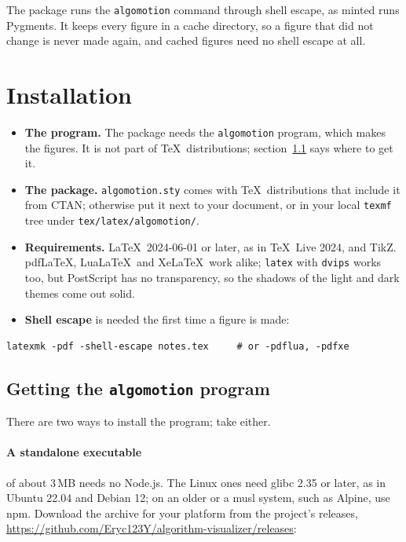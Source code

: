\documentclass[11pt]{article}
\newcommand\pkg[1]{\textsf{#1}}
\begin{document}
The package runs the \texttt{algomotion} command through shell escape, as
\pkg{minted} runs Pygments. It keeps every figure in a cache directory, so a
figure that did not change is never made again, and cached figures need no
shell escape at all.

\section{Installation}

\begin{itemize}
  \item \textbf{The program.} The package needs the \texttt{algomotion}
    program, which makes the figures. It is not part of \TeX\
    distributions; section~\ref{sec:program} says where to get it.
  \item \textbf{The package.} \texttt{algomotion.sty} comes with
    \TeX\ distributions that include it from CTAN; otherwise put it next to
    your document, or in your local \texttt{texmf} tree under
    \nolinkurl{tex/latex/algomotion/}.
  \item \textbf{Requirements.} \LaTeX\ 2024-06-01 or later, as in \TeX\ Live
    2024, and TikZ. pdf\LaTeX, Lua\LaTeX\ and Xe\LaTeX\ work alike;
    \texttt{latex} with \texttt{dvips} works too, but PostScript has no
    transparency, so the shadows of the light and dark themes come out solid.
  \item \textbf{Shell escape} is needed the first time a figure is made:
\end{itemize}

\begin{lstlisting}
latexmk -pdf -shell-escape notes.tex     # or -pdflua, -pdfxe
\end{lstlisting}

\subsection{Getting the \texttt{algomotion} program}
\label{sec:program}

There are two ways to install the program; take either.

\paragraph{A standalone executable} of about 3\,MB needs no Node.js. The
Linux ones need glibc 2.35 or later, as in Ubuntu 22.04 and Debian 12; on an
older or a musl system, such as Alpine, use npm.
Download the archive for your platform from the project's releases,
\url{https://github.com/Eryc123Y/algorithm-visualizer/releases}:
\end{document}

